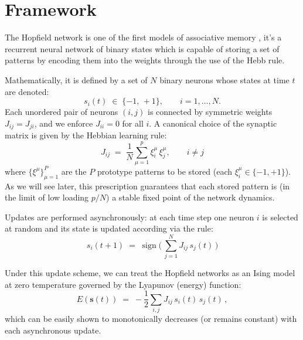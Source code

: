 \documentclass[a4paper,12pt]{report}
\begin{document}
\section{Framework}
The Hopfield network is one of the first models of associative memory \cite{Hopfield1982, Hopfield1984}, it's a recurrent neural network of binary states which is capable of
storing a set of patterns by encoding them into the weights through the use of the Hebb 
rule.
\vspace*{0.5em}

Mathematically, it is defined by a set of \(N\) binary neurons whose states at time 
\(t\) are denoted:
\[
s_i(t) \;\in\; \{ -1,\,+1\}, 
\qquad i = 1, \dots, N.
\]
Each unordered pair of neurons \((i,j)\) is connected by symmetric weights 
\(J_{ij} = J_{ji}\), and we enforce \(J_{ii}=0\) for all \(i\).  A canonical choice of 
the synaptic matrix is given by the Hebbian learning rule:
\begin{equation}
J_{ij}
\;=\;
\frac{1}{N} \sum_{\mu=1}^{p} \xi_i^{\mu}\,\xi_j^{\mu}, \qquad i \neq j
\end{equation}
where \(\{\xi^{\mu}\}_{\mu=1}^P\) are the \(P\) prototype patterns to be stored (each 
\(\xi_i^\mu\in\{-1,+1\}\)). As we will see later, this prescription guarantees that each 
stored pattern is (in the limit of low loading \(p/N\)) a stable fixed point of the 
network dynamics.

Updates are performed asynchronously: at each time step one neuron \(i\) is selected 
at random and its state is updated according via the rule:
\begin{equation}
  s_i(t+1)\;=\;\operatorname{sign}\bigl(\,\sum_{j=1}^N J_{ij}\,s_j(t)\,\bigr)
\end{equation}

Under this update scheme, we can treat the Hopfield networks as an Ising model at zero
temperature governed by the Lyapunov (energy) function:
\begin{equation}\label{eq:energy}
E(\mathbf{s}\left(t\right))
\;=\;
- \frac{1}{2} \sum_{i,j} J_{ij}\,s_i\left(t\right)\,s_j\left(t\right)\,,
\end{equation}
which can be easily shown to monotonically decreases (or remains constant) with each 
asynchronous update.
\vspace*{0.5em}
\end{document}
